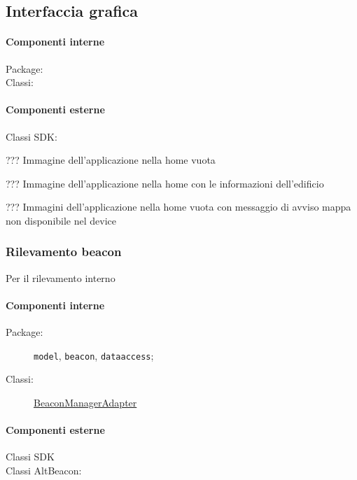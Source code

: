 \documentclass[../ManualeSviluppatore.tex]{subfiles}
\begin{document}
		\subsection{Interfaccia grafica}
		
			\paragraph*{Componenti interne}
			\begin{description}
				\item[Package:]
				\item[Classi:]
			\end{description}
			
			\paragraph*{Componenti esterne}
			\begin{description}
				\item[Classi SDK:] 
			\end{description}
			
			??? Immagine dell'applicazione nella home vuota
			
			??? Immagine dell'applicazione nella home con le informazioni dell'edificio
			
			??? Immagini dell'applicazione nella home vuota con messaggio di avviso mappa non disponibile nel device
			
		\subsubsection{Rilevamento beacon}
			Per il rilevamento interno 
			
			\paragraph*{Componenti interne}
			\begin{description}
				\item[Package:] \verb|model|, \verb|beacon|, \verb|dataaccess|;
				\item[Classi:] \href{http://leafswe.github.io/clips/}{BeaconManagerAdapter}
			\end{description}
			
			\paragraph*{Componenti esterne}
			\begin{description}
				\item[Classi SDK]
				\item[Classi AltBeacon:] 
			\end{description}
			
\end{document}
